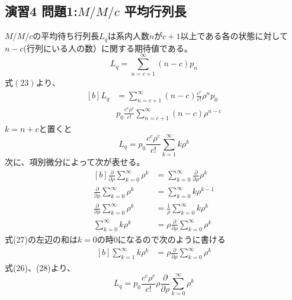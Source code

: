 \documentclass{report}
\begin{document}
\begin{CJK}{UTF8}{min}
    \section*{演習4 問題1:$M/M/c$ 平均行列長}
    $M/M/c$の平均待ち行列長$L_q$は系内人数$n$が$c+1$以上である各の状態に対して$n-c$(行列にいる人の数）に関する期待値である。
    \begin{equation}
        L_q=\sum_{n=c+1}^\infty (n-c)p_n
    \end{equation}
    式$(23)$より、
    \begin{equation}
        \begin{aligned}[b]
            L_q & =\sum_{n=c+1}^\infty (n-c)\frac{c^c}{c!}\rho^np_0          \\
                & p_0\frac{c^c\rho^c}{c!}\sum_{n=c+1}^\infty (n-c)\rho^{n-c}
        \end{aligned}
    \end{equation}
    $k=n+c$と置くと
    \begin{equation}
        L_q=p_0\frac{c^c\rho^c}{c!}\sum_{k=1}^\infty k\rho^k
    \end{equation}
    次に、項別微分によって次が表せる。
    \begin{equation}
        \begin{aligned}[b]
            \frac{\partial}{\partial\rho}\sum_{k=0}^{\infty}\rho^k & =\sum_{k=0}^{\infty}\frac{\partial}{\partial\rho}\rho^k     \\
            \frac{\partial}{\partial\rho}\sum_{k=0}^{\infty}\rho^k & =\sum_{k=0}^{\infty}k\rho^{k-1}                             \\
            \frac{\partial}{\partial\rho}\sum_{k=0}^{\infty}\rho^k & =\frac{1}{\rho}\sum_{k=0}^{\infty}k\rho^{k}                 \\
            \sum_{k=0}^{\infty}k\rho^{k}                           & =\rho\frac{\partial}{\partial\rho}\sum_{k=0}^{\infty}\rho^k
        \end{aligned}
    \end{equation}
    式(27)の左辺の和は$k=0$の時$0$になるので次のように書ける
    \begin{equation}
        \begin{aligned}[b]
            \sum_{k=1}^{\infty}k\rho^{k} & =\rho\frac{\partial}{\partial\rho}\sum_{k=0}^{\infty}\rho^k
        \end{aligned}
    \end{equation}
    式(26)、(28)より、
    \begin{equation}
        L_q=p_0\frac{c^c\rho^c}{c!}\rho\frac{\partial}{\partial\rho}\sum_{k=0}^{\infty}\rho^k

\end{equation}
\end{CJK}
\end{document}
